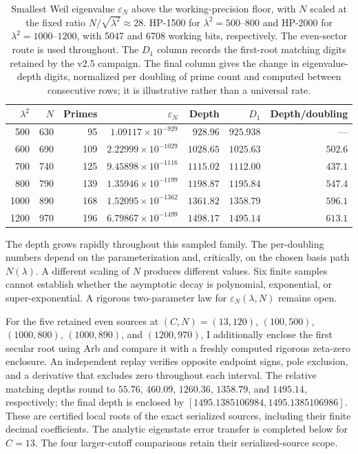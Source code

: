 \documentclass[11pt,a4paper]{article}
\begin{document}
\begin{table}[!htbp]
\centering
\caption{Smallest Weil eigenvalue $\varepsilon_N$ above the
working-precision floor, with $N$ scaled at the fixed ratio
$N/\sqrt{\lambda^2}\approx28$. HP-1500 for $\lambda^2=500$--$800$
and HP-2000 for $\lambda^2=1000$--$1200$, with 5047 and 6708
working bits, respectively. The even-sector route is used throughout.
The $D_1$ column records the first-root matching digits retained by the
v2.5 campaign. The final column gives the
change in eigenvalue-depth digits, normalized per doubling of prime
count and computed between consecutive rows; it is illustrative rather
than a universal rate.}
\label{tab:eps_N_abovefloor}
\small
\begin{tabular}{@{}rrrrrrr@{}}
\toprule
$\lambda^2$ & $N$ & Primes & $\varepsilon_N$ & Depth & $D_1$ & Depth/doubling \\
\midrule
500  & 630 & 95  & $1.09117\times10^{-929}$  & $928.96$  & $925.938$ & --- \\
600  & 690 & 109 & $2.22999\times10^{-1029}$ & $1028.65$ & $1025.63$ & $502.6$ \\
700  & 740 & 125 & $9.45898\times10^{-1116}$ & $1115.02$ & $1112.00$ & $437.1$ \\
800  & 790 & 139 & $1.35946\times10^{-1199}$ & $1198.87$ & $1195.84$ & $547.4$ \\
1000 & 890 & 168 & $1.52095\times10^{-1362}$ & $1361.82$ & $1358.79$ & $596.1$ \\
1200 & 970 & 196 & $6.79867\times10^{-1499}$ & $1498.17$ & $1495.14$ & $613.1$ \\
\bottomrule
\end{tabular}
\end{table}

The depth grows rapidly throughout this sampled family. The per-doubling
numbers depend on the parameterization and, critically, on the chosen
basis path $N(\lambda)$. A different scaling of $N$ produces different
values. Six finite samples cannot establish whether the asymptotic
decay is polynomial, exponential, or super-exponential. A rigorous
two-parameter law for $\varepsilon_N(\lambda,N)$ remains open.

For the five retained even sources at $(C,N)=(13,120)$, $(100,500)$,
$(1000,800)$, $(1000,890)$, and $(1200,970)$, I additionally enclose
the first secular root using Arb and compare it with a freshly
computed rigorous zeta-zero enclosure. An independent replay verifies
opposite endpoint signs, pole exclusion, and a derivative that excludes
zero throughout each interval. The relative matching depths round to
$55.76$, $460.09$, $1260.36$, $1358.79$, and $1495.14$, respectively;
the final depth is enclosed by
$[1495.1385106984,1495.1385106986]$. These are certified local roots
of the exact serialized sources, including their finite decimal
coefficients. The analytic eigenstate error transfer is completed below for $C=13$.
The four larger-cutoff comparisons retain their serialized-source scope.
\end{document}
